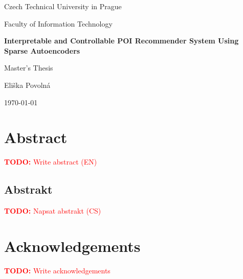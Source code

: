 \documentclass[12pt, a4paper, twoside]{report}
\newcommand{\todo}[1]{\textcolor{red}{\textbf{TODO:} #1}}
\begin{document}
\begin{titlepage}
  \centering
  \vspace*{2cm}
  {\large Czech Technical University in Prague \par}
  {\large Faculty of Information Technology \par}
  \vspace{3cm}
  {\LARGE\bfseries Interpretable and Controllable POI Recommender System Using Sparse Autoencoders \par}
  \vspace{1cm}
  {\large Master's Thesis \par}
  \vfill
  {\large Eliška Povolná \par}
  {\large \today \par}
\end{titlepage}


\chapter*{Abstract}
\todo{Write abstract (EN)}

\begin{otherlanguage}{czech}
\chapter*{Abstrakt}
\todo{Napsat abstrakt (CS)}
\end{otherlanguage}

\chapter*{Acknowledgements}
\todo{Write acknowledgements}

\tableofcontents
\listoffigures
\listoftables








\printbibliography[heading=bibintoc]

\appendix

\end{document}

